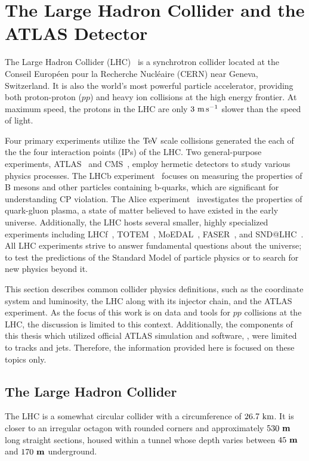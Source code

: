 
\chapter{The Large Hadron Collider and the ATLAS Detector}
\label{ch:lhc_atlas_detector}

The Large Hadron Collider (LHC)~\cite{LHCMachine,LHC1,LHC2, LHC3} is a synchrotron collider located at the Conseil Européen pour la Recherche Nucléaire (CERN) near Geneva, Switzerland.
It is also the world's most powerful particle accelerator, providing both proton-proton ($pp$) and heavy ion collisions at the high energy frontier.
At maximum speed, the protons in the LHC are only $3~\mps$ slower than the speed of light.

Four primary experiments utilize the $\TeV$ scale collisions generated the each of the the four interaction points (IPs) of the LHC.
Two general-purpose experiments, ATLAS~\cite{ATLAS} and CMS~\cite{CMS}, employ hermetic detectors to study various physics processes.
The LHCb experiment~\cite{LHCb} focuses on measuring the properties of B mesons and other particles containing b-quarks, which are significant for understanding CP violation.
The Alice experiment~\cite{ALICE} investigates the properties of quark-gluon plasma, a state of matter believed to have existed in the early universe.
Additionally, the LHC hosts several smaller, highly specialized experiments including LHCf~\cite{LHCf}, TOTEM~\cite{TOTEM}, MoEDAL~\cite{MoEDAL}, FASER~\cite{FASER}, and SND@LHC~\cite{SNDLHC}.
All LHC experiments strive to answer fundamental questions about the universe; to test the predictions of the Standard Model of particle physics or to search for new physics beyond it.

This section describes common collider physics definitions, such as the coordinate system and luminosity,
the LHC along with its injector chain, and the ATLAS experiment.
As the focus of this work is on data and tools for $pp$ collisions at the LHC, the discussion is limited to this context.
Additionally, the components of this thesis which utilized official ATLAS simulation and software, , were limited to tracks and jets.
Therefore, the information provided here is focused on these topics only.

\section{The Large Hadron Collider}

The LHC is a somewhat circular collider with a circumference of $26.7~\km$.
It is closer to an irregular octagon with rounded corners and approximately $ 530~\mathbf{m} $ long straight sections, housed within a tunnel whose depth varies between $45~\mathbf{m}$ and $170~\mathbf{m}$ underground.

